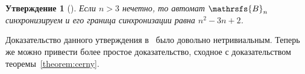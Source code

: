 \documentclass[11pt]{article}
\newtheorem{theorem}{Утверждение}
\begin{document}
\begin{theorem}[{\mdseries\cite[Theorem~1.1]{AVZ}}]
\label{theorem:avz}
Если $n>3$ нечетно, то автомат $\mathrsfs{B}_n$ синхронизируем и его граница
синхронизации равна $n^2-3n+2$.

\end{theorem}

%

Доказательство данного утверждения в~\cite{AVZ} было довольно нетривиальным. Теперь же можно привести
более простое доказательство, сходное с доказательством теоремы~\ref{theorem:cerny}.
\end{document}
